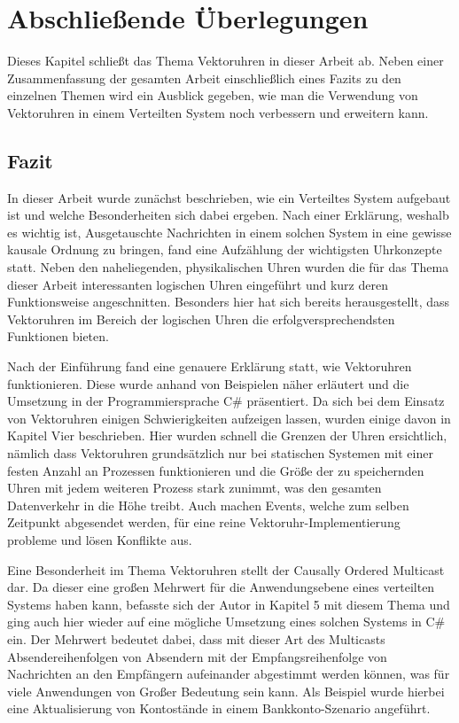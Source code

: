 \section{Abschließende Überlegungen}
Dieses Kapitel schließt das Thema Vektoruhren in dieser Arbeit ab. Neben einer Zusammenfassung der gesamten Arbeit einschließlich eines Fazits zu den einzelnen Themen wird ein Ausblick gegeben, wie man die Verwendung von Vektoruhren in einem Verteilten System noch verbessern und erweitern kann.
\subsection{Fazit}
In dieser Arbeit wurde zunächst beschrieben, wie ein Verteiltes System aufgebaut ist und welche Besonderheiten sich dabei ergeben. Nach einer Erklärung, weshalb es wichtig ist, Ausgetauschte Nachrichten in einem solchen System in eine gewisse kausale Ordnung zu bringen, fand eine Aufzählung der wichtigsten Uhrkonzepte statt. Neben den naheliegenden, physikalischen Uhren wurden die für das Thema dieser Arbeit interessanten logischen Uhren eingeführt und kurz deren Funktionsweise angeschnitten. Besonders hier hat sich bereits herausgestellt, dass Vektoruhren im Bereich der logischen Uhren die erfolgversprechendsten Funktionen bieten.

Nach der Einführung fand eine genauere Erklärung statt, wie Vektoruhren funktionieren. Diese wurde anhand von Beispielen näher erläutert und die Umsetzung in der Programmiersprache C\# präsentiert. Da sich bei dem Einsatz von Vektoruhren einigen Schwierigkeiten aufzeigen lassen, wurden einige davon in Kapitel Vier beschrieben. Hier wurden schnell die Grenzen der Uhren ersichtlich, nämlich dass Vektoruhren grundsätzlich nur bei statischen Systemen mit einer festen Anzahl an Prozessen funktionieren und die Größe der zu speichernden Uhren mit jedem weiteren Prozess stark zunimmt, was den gesamten Datenverkehr in die Höhe treibt. Auch machen Events, welche zum selben Zeitpunkt abgesendet werden, für eine reine Vektoruhr-Implementierung probleme und lösen Konflikte aus.

Eine Besonderheit im Thema Vektoruhren stellt der Causally Ordered Multicast dar. Da dieser eine großen Mehrwert für die Anwendungsebene eines verteilten Systems haben kann, befasste sich der Autor in Kapitel 5 mit diesem Thema und ging auch hier wieder auf eine mögliche Umsetzung eines solchen Systems in C\# ein. Der Mehrwert bedeutet dabei, dass mit dieser Art des Multicasts Absendereihenfolgen von Absendern mit der Empfangsreihenfolge von Nachrichten an den Empfängern aufeinander abgestimmt werden können, was für viele Anwendungen von Großer Bedeutung sein kann. Als Beispiel wurde hierbei eine Aktualisierung von Kontostände in einem Bankkonto-Szenario angeführt.

